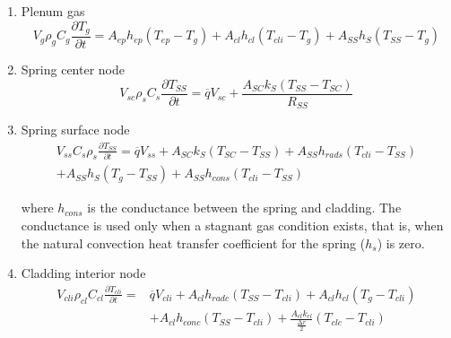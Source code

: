 \begin{enumerate}
  \item Plenum gas
    \begin{equation}
        \label{eq:plenum_temp_calc_plenum_gas}
        V_{g}\rho_{g}C_{g}\frac{\partial T_{g}}{\partial t} = A_{ep}h_{ep}\left( T_{ep} - T_{g} \right) + A_{cl}h_{cl}\left( T_{cli} - T_{g} \right) + A_{SS}h_{S}\left( T_{SS} - T_{g} \right)
    \end{equation}

  \item Spring center node
    \begin{equation}
        \label{eq:plenum_temp_calc_spring_center_node}
        V_{sc}\rho_{s}C_{s}\frac{\partial T_{SS}}{\partial t} = \overline{q}V_{sc} + \frac{A_{SC}k_{S}\left( T_{SS} - T_{SC} \right)}{R_{SS}}
    \end{equation}

  \item Spring surface node
    \begin{equation}
        \label{eq:plenum_temp_calc_spring_surface_node}
        \begin{aligned}
            V_{ss}C_{s}\rho_{s}\frac{\partial T_{SS}}{\partial t} = \overline{q}V_{ss} + A_{SC}k_{S}\left( T_{SC} - T_{SS} \right) + A_{SS}h_{rads}\left( T_{cli} - T_{SS} \right) \\
            + A_{SS}h_{S}\left( T_{g} - T_{SS} \right) + A_{SS}h_{cons}\left( T_{cli} - T_{SS} \right)
        \end{aligned}
    \end{equation}

where \(h_{cons}\) is the conductance between the spring and cladding. The
conductance is used only when a stagnant gas condition exists, that
is, when the natural convection heat transfer coefficient for the
spring (\(h_{s}\)) is zero.

  \item Cladding interior node
    \begin{equation}
        \label{eq:plenum_temp_calc_clad_interior_node}
        \begin{aligned}
             V_{cli}\rho_{cl}C_{cl}\frac{\partial T_{cli}}{\partial t} = & \overline{q}V_{cli} + A_{cl}h_{radc}\left( T_{SS} - T_{cli} \right) +  A_{cl}h_{cl}\left( T_{g} - T_{cli} \right) \\
             & + A_{cl}h_{conc}\left( T_{SS} - T_{cli} \right) + \frac{A_{cl}k_{cl}}{\frac{\mathrm{\Delta}r}{2}}\left( T_{clc} - T_{cli} \right)
        \end{aligned}
    \end{equation}


\end{enumerate}
